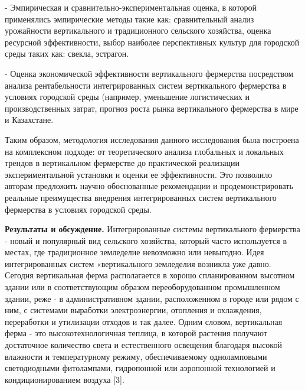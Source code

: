 \begin{multicols}{2}
- Эмпирическая и сравнительно-эксперимент\-альная оценка, в которой
применялись эмпирические методы такие как: сравнительный анализ
урожайности вертикального и традиционного сельского хозяйства, оценка
ресурсной эффективности, выбор наиболее перспективных культур для
городской среды таких как: свекла, эстрагон.

- Оценка экономической эффективности вертикального фермерства
посредством анализа рентабельности интегрированных систем вертикального
фермерства в условиях городской среды (например, уменьшение
логистических и производственных затрат, прогноз роста рынка
вертикального фермерства в мире и Казахстане.

Таким образом, методология исследования данного исследования была
построена на комплексном подходе: от теоретического анализа глобальных и
локальных трендов в вертикальном фермерстве до практической реализации
экспериментальной установки и оценки ее эффективности. Это позволило
авторам предложить научно обоснованные рекомендации и продемонстрировать
реальные преимущества внедрения интегрированных систем вертикального
фермерства в условиях городской среды.

{\bfseries Результаты и обсуждение.} Интегрированные системы вертикального
фермерства - новый и популярный вид сельского хозяйства, который часто
используется в местах, где традиционное земледелие невозможно или
невыгодно. Идея интегрированных систем «вертикального земледелия
возникла уже давно. Сегодня вертикальная ферма располагается в хорошо
спланированном высотном здании или в соответствующим образом
переоборудованном промышленном здании, реже - в административном здании,
расположенном в городе или рядом с ним, с системами выработки
электроэнергии, отопления и охлаждения, переработки и утилизации отходов
и так далее. Одним словом, вертикальная ферма - это высокотехнологичная
теплица, в которой растения получают достаточное количество света и
естественного освещения благодаря высокой влажности и температурному
режиму, обеспечиваемому одноламповыми светодиодными фитолампами,
гидропонной или аэропонной технологией и кондиционированием воздуха
{[}3{]}.


\end{multicols}

